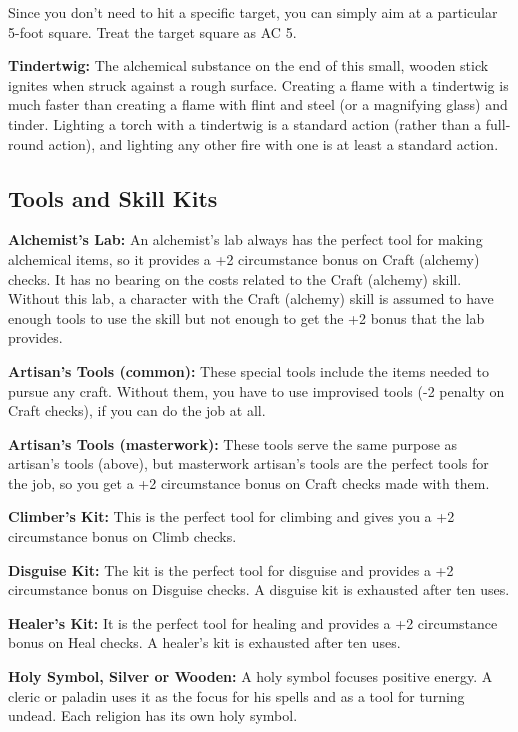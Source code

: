 \begin{multicols}{2}
Since you don't need to hit a specific target, you can simply aim at a particular 
5-foot square. Treat the target square as AC 5.

\textbf{Tindertwig:} The alchemical substance on the end of this small, wooden 
stick ignites when struck against a rough surface. Creating a flame with a tindertwig 
is much faster than creating a flame with flint and steel (or a magnifying glass) 
and tinder. Lighting a torch with a tindertwig is a standard action (rather than 
a full-round action), and lighting any other fire with one is at least a standard 
action.

\subsection{Tools and Skill Kits}

\textbf{Alchemist's Lab:} An alchemist's lab always has the perfect tool for making 
alchemical items, so it provides a +2 circumstance bonus on Craft (alchemy) checks. 
It has no bearing on the costs related to the Craft (alchemy) skill. Without this 
lab, a character with the Craft (alchemy) skill is assumed to have enough tools 
to use the skill but not enough to get the +2 bonus that the lab provides.

\textbf{Artisan's Tools (common):} These special tools include the items needed to pursue 
any craft. Without them, you have to use improvised tools (-2 penalty on Craft 
checks), if you can do the job at all.

\textbf{Artisan's Tools (masterwork):} These tools serve the same purpose as artisan's 
tools (above), but masterwork artisan's tools are the perfect tools for the job, 
so you get a +2 circumstance bonus on Craft checks made with them.

\textbf{Climber's Kit:} This is the perfect tool for climbing and gives you a +2 
circumstance bonus on Climb checks.

\textbf{Disguise Kit:} The kit is the perfect tool for disguise and provides a 
+2 circumstance bonus on Disguise checks. A disguise kit is exhausted after ten 
uses.

\textbf{Healer's Kit:} It is the perfect tool for healing and provides a +2 circumstance 
bonus on Heal checks. A healer's kit is exhausted after ten uses.

\textbf{Holy Symbol, Silver or Wooden:} A holy symbol focuses positive energy. 
A cleric or paladin uses it as the focus for his spells and as a tool for turning 
undead. Each religion has its own holy symbol.


\end{multicols}
